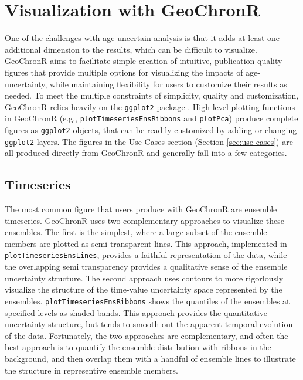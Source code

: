 \documentclass[gchron, manuscript]{copernicus}
\begin{document}
\hypertarget{sec:visualization}{%
\section{Visualization with GeoChronR}\label{sec:visualization}}

One of the challenges with age-uncertain analysis is that it adds at least one additional dimension to the results, which can be difficult to visualize.
GeoChronR aims to facilitate simple creation of intuitive, publication-quality figures that provide multiple options for visualizing the impacts of age-uncertainty, while maintaining flexibility for users to customize their results as needed.
To meet the multiple constraints of simplicity, quality and customization, GeoChronR relies heavily on the \texttt{ggplot2} package \citep{ggplot2}.
High-level plotting functions in GeoChronR (e.g., \texttt{plotTimeseriesEnsRibbons} and \texttt{plotPca}) produce complete figures as \texttt{ggplot2} objects, that can be readily customized by adding or changing \texttt{ggplot2} layers.
The figures in the Use Cases section (Section \ref{sec:use-cases}) are all produced directly from GeoChronR and generally fall into a few categories.

\subsection{Timeseries}

The most common figure that users produce with GeoChronR are ensemble timeseries.
GeoChronR uses two complementary approaches to visualize these ensembles.
The first is the simplest, where a large subset of the ensemble members are plotted as semi-transparent lines.
This approach, implemented in \texttt{plotTimeseriesEnsLines}, provides a faithful representation of the data, while the overlapping semi transparency provides a qualitative sense of the ensemble uncertainty structure.
The second approach uses contours to more rigorlously visualize the structure of the time-value uncertainty space represented by the ensembles.
\texttt{plotTimeseriesEnsRibbons} shows the quantiles of the ensembles at specified levels as shaded bands.
This approach provides the quantitative uncertainty structure, but tends to smooth out the apparent temporal evolution of the data.
Fortunately, the two approaches are complementary, and often the best approach is to quantify the ensemble distribution with ribbons in the background, and then overlap them with a handful of ensemble lines to illustrate the structure in representive ensemble members.
\end{document}
